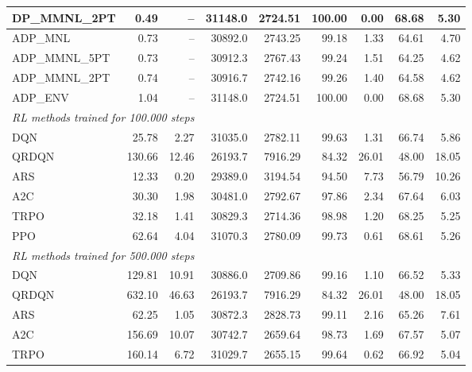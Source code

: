 \begin{samepage}
\begin{center}
\begin{tabular}{l|rr|rr|rr|rr}
    DP\_MMNL\_2PT &     0.49 &    -- &    31148.0 &    2724.51 &  100.00 &    0.00 &   68.68 &    5.30 \\
    \midrule
    ADP\_MNL     &     0.73 &    -- &    30892.0 &    2743.25 &   99.18 &    1.33 &   64.61 &    4.70 \\
    ADP\_MMNL\_5PT &     0.73 &    -- &    30912.3 &    2767.43 &   99.24 &    1.51 &   64.25 &    4.62 \\
    ADP\_MMNL\_2PT &     0.74 &    -- &    30916.7 &    2742.16 &   99.26 &    1.40 &   64.58 &    4.62 \\
    ADP\_ENV     &     1.04 &    -- &    31148.0 &    2724.51 &  100.00 &    0.00 &   68.68 &    5.30 \\
    \midrule
    \multicolumn{9}{l}{\textit{RL methods trained for 100.000 steps}} \\
    \midrule
    DQN          &    25.78 &     2.27 &    31035.0 &    2782.11 &   99.63 &    1.31 &   66.74 &    5.86 \\
    QRDQN        &   130.66 &    12.46 &    26193.7 &    7916.29 &   84.32 &   26.01 &   48.00 &   18.05 \\
    ARS          &    12.33 &     0.20 &    29389.0 &    3194.54 &   94.50 &    7.73 &   56.79 &   10.26 \\
    A2C          &    30.30 &     1.98 &    30481.0 &    2792.67 &   97.86 &    2.34 &   67.64 &    6.03 \\
    TRPO         &    32.18 &     1.41 &    30829.3 &    2714.36 &   98.98 &    1.20 &   68.25 &    5.25 \\
    PPO          &    62.64 &     4.04 &    31070.3 &    2780.09 &   99.73 &    0.61 &   68.61 &    5.26 \\
    \midrule
    \multicolumn{9}{l}{\textit{RL methods trained for 500.000 steps}} \\
    \midrule
    DQN          &   129.81 &    10.91 &    30886.0 &    2709.86 &   99.16 &    1.10 &   66.52 &    5.33 \\
    QRDQN        &   632.10 &    46.63 &    26193.7 &    7916.29 &   84.32 &   26.01 &   48.00 &   18.05 \\
    ARS          &    62.25 &     1.05 &    30872.3 &    2828.73 &   99.11 &    2.16 &   65.26 &    7.61 \\
    A2C          &   156.69 &    10.07 &    30742.7 &    2659.64 &   98.73 &    1.69 &   67.57 &    5.07 \\
    TRPO         &   160.14 &     6.72 &    31029.7 &    2655.15 &   99.64 &    0.62 &   66.92 &    5.04 \\

\end{tabular}
\end{center}
\end{samepage}
